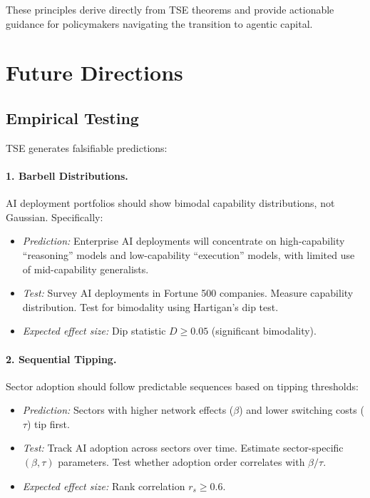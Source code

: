 \documentclass[12pt]{article}
\begin{document}
These principles derive directly from TSE theorems and provide actionable guidance for policymakers navigating the transition to agentic capital.


\section{Future Directions}
\label{sec:future}

\subsection{Empirical Testing}

TSE generates falsifiable predictions:

\paragraph{1. Barbell Distributions.} AI deployment portfolios should show bimodal capability distributions, not Gaussian. Specifically:
\begin{itemize}
    \item \textit{Prediction:} Enterprise AI deployments will concentrate on high-capability ``reasoning'' models and low-capability ``execution'' models, with limited use of mid-capability generalists.
    \item \textit{Test:} Survey AI deployments in Fortune 500 companies. Measure capability distribution. Test for bimodality using Hartigan's dip test.
    \item \textit{Expected effect size:} Dip statistic $D \geq 0.05$ (significant bimodality).
\end{itemize}

\paragraph{2. Sequential Tipping.} Sector adoption should follow predictable sequences based on tipping thresholds:
\begin{itemize}
    \item \textit{Prediction:} Sectors with higher network effects ($\beta$) and lower switching costs ($\tau$) tip first.
    \item \textit{Test:} Track AI adoption across sectors over time. Estimate sector-specific $(\beta, \tau)$ parameters. Test whether adoption order correlates with $\beta/\tau$.
    \item \textit{Expected effect size:} Rank correlation $r_s \geq 0.6$.
\end{itemize}
\end{document}
